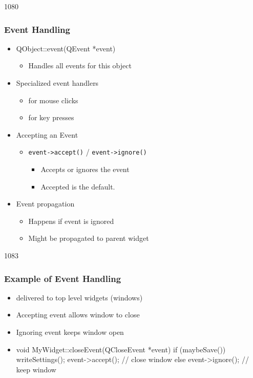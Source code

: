 \begin{slide}{1080}
\frametitle{Event Handling}

\begin{itemize}
\item QObject::event(QEvent *event)
  \begin{itemize}
  \item Handles all events for this object
 \end{itemize}
\item Specialized event handlers
  \begin{itemize}
  \item {} for mouse clicks
  \item {} for key presses     
 \end{itemize}
\item Accepting an Event
  \begin{itemize}
  \item \lstinline{event->accept()} / \lstinline{event->ignore()}
    \begin{itemize}
    \item Accepts or ignores the event
    \item Accepted is the default.
    \end{itemize}
  \end{itemize}
\item Event propagation
  \begin{itemize}
  \item Happens if event is ignored
  \item Might be propagated to parent widget
  \end{itemize}
\end{itemize}
\end{slide}

\begin{slide}[fragile]{1083}
\frametitle{Example of Event Handling}

\begin{itemize}
\item {} delivered to top level widgets (windows)
\item Accepting event allows window to close
\item Ignoring event keeps window open
\item[]
\begin{cpp}
void MyWidget::closeEvent(QCloseEvent *event) {
  if (maybeSave()) {
    writeSettings();
    event->accept(); // close window
  } else {
    event->ignore(); // keep window
  }
}
\end{cpp}  
\end{itemize}

\end{slide}

